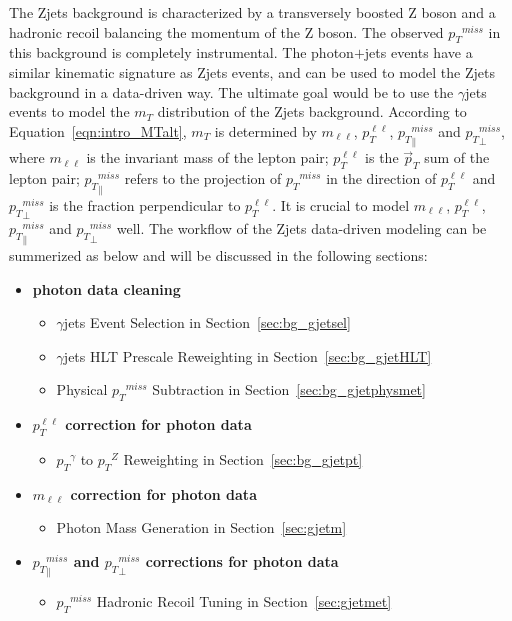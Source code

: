 \vspace{0.3cm}
The Zjets background is characterized by a transversely boosted Z boson and a hadronic recoil balancing the momentum of the Z boson. The observed ${p_{T}}^{miss}$ in this background is completely instrumental. The photon$+$jets events have a similar kinematic signature as Zjets events, and can be used to model the Zjets background in a data-driven way. The ultimate goal would be to use the $\gamma$jets events to model the $m_T$ distribution of the Zjets background. According to Equation~\ref{eqn:intro_MTalt}, $m_T$ is determined by $m_{\ell\ell}$, ${p}_{T}^{\ell\ell}$, ${p_{T}}^{miss}_\parallel$ and ${p_{T}}^{miss}_\perp$, where $m_{\ell\ell}$ is the invariant mass of the lepton pair; ${p}_{T}^{\ell\ell}$ is the $\vec p_T$ sum of the lepton pair; ${p_{T}}^{miss}_\parallel$ refers to the projection of ${p_{T}}^{miss}$ in the direction of ${p}_{T}^{\ell\ell}$ and ${p_{T}}^{miss}_\perp$ is the fraction perpendicular to ${p}_{T}^{\ell\ell}$. It is crucial to model $m_{\ell\ell}$, ${p}_{T}^{\ell\ell}$, ${p_{T}}^{miss}_\parallel$ and ${p_{T}}^{miss}_\perp$ well. The workflow of the Zjets data-driven modeling can be summerized as below and will be discussed in the following sections:
\begin{itemize}
\item \textbf{photon data cleaning}
\begin{itemize}
\item $\gamma$jets Event Selection in Section~\ref{sec:bg_gjetsel}
\item $\gamma$jets HLT Prescale Reweighting in Section~\ref{sec:bg_gjetHLT}
\item Physical ${p_{T}}^{miss}$ Subtraction in Section~\ref{sec:bg_gjetphysmet}
\end{itemize}
\item \textbf{${p}_{T}^{\ell\ell}$ correction for photon data}
\begin{itemize}
\item ${p_T}^{\gamma}$ to ${p_T}^Z$ Reweighting in Section~\ref{sec:bg_gjetpt}
\end{itemize}
\item \textbf{$m_{\ell\ell}$ correction for photon data}
\begin{itemize}
\item Photon Mass Generation in Section~\ref{sec:gjetm}
\end{itemize}
\item \textbf{${p_{T}}^{miss}_\parallel$ and ${p_{T}}^{miss}_\perp$ corrections for photon data}
\begin{itemize}
\item ${p_{T}}^{miss}$ Hadronic Recoil Tuning in Section~\ref{sec:gjetmet}
\end{itemize}
\end{itemize}

